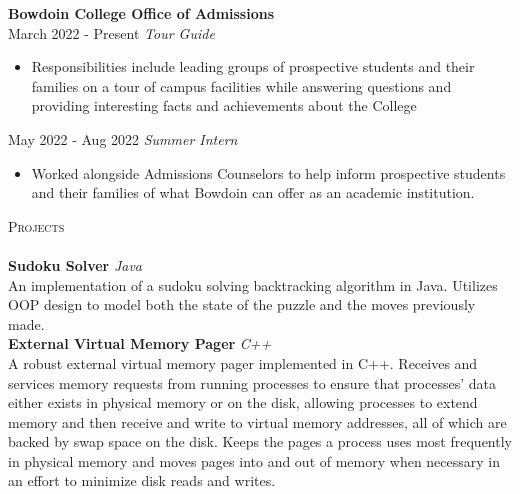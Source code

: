 \documentclass[letterpaper]{article}
\newcommand{\lineunder} {
    \vspace*{-8pt} \\
    \hspace*{-18pt} \hrulefill \\
}
\newcommand{\header} [1] {
    {\hspace*{-18pt}\vspace*{6pt} \textsc{#1}}
    \vspace*{-6pt} \lineunder
}
\begin{document}
\textbf{Bowdoin College Office of Admissions}\\
\vspace{1mm}
March 2022 - Present \hspace{0.75mm}\textbar{}\space \textit{Tour Guide}\\
\vspace{-1mm}
\begin{itemize} \itemsep 1pt
	\item Responsibilities include leading groups of prospective students and their families on a tour of campus facilities while answering questions and providing interesting facts and achievements about the College
\end{itemize}

\vspace{-1mm}
May 2022 - Aug 2022 \space\textbar{}\space \textit{Summer Intern}\\
\vspace{-1mm}
\begin{itemize} \itemsep 1pt
	\item Worked alongside Admissions Counselors to help inform prospective students and their families of what Bowdoin can offer as an academic institution.
\end{itemize}

\header{Projects}
{\textbf{Sudoku Solver}} {\sl Java} \hfill \\
An implementation of a sudoku solving backtracking algorithm in Java. Utilizes OOP design to model both the state of the puzzle and the moves previously made.\\
\vspace*{2mm}
{\textbf{External Virtual Memory Pager}} {\sl C++} \\
A robust external virtual memory pager implemented in C++. Receives and services memory requests from running processes to ensure that processes’ data either exists in physical memory or on the disk, allowing processes to extend memory and then receive and write to virtual memory addresses, all of which are backed by swap space on the disk. Keeps the pages a process uses most frequently in physical memory and moves pages into and out of memory when necessary in an effort to minimize disk reads and writes.\\
\vspace*{2mm}


\ 
\end{document}
